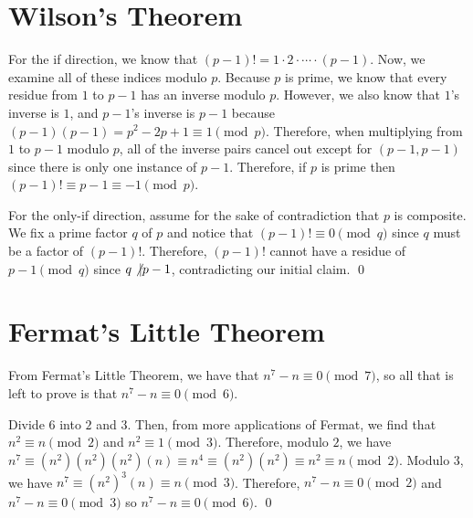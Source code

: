 \documentclass{article}
\begin{document}
	\newpage
	\section{Wilson's Theorem}
	For the if direction, we know that $(p-1)! = 1 \cdot 2 \cdot \cdots \cdot (p-1)$. Now, we examine all of these indices modulo $p$. Because 
	$p$ is prime, we know that every residue from $1$ to $p-1$ has an inverse modulo $p$. However, we also know that $1$'s 
	inverse is $1$, and $p-1$'s inverse is $p-1$ because $(p-1)(p-1) = p^2-2p+1 \equiv 1 \pmod p$. Therefore, when multiplying 
	from $1$ to $p-1$ modulo $p$, all of the inverse pairs cancel out except for $(p-1, p-1)$ since there is only one instance
	of $p-1$. Therefore, if $p$ is prime then $(p-1)! \equiv p-1 \equiv -1 \pmod p$.

	For the only-if direction, assume for the sake of contradiction that $p$ is composite. We fix a prime factor $q$ of $p$ and notice that
	 $(p-1)! \equiv 0 \pmod q$
	since $q$ must be a factor of $(p-1)!$. Therefore, $(p-1)!$ cannot have a residue of $p-1 \pmod q$ since $q \not\vert p-1$, contradicting
	our initial claim. \qed

	\newpage
	\section{Fermat's Little Theorem}
	From Fermat's Little Theorem, we have that $n^7-n \equiv 0 \pmod 7$, so all that is left to prove is that $n^7-n \equiv 0 \pmod 6$.
	
	Divide $6$ into $2$ and $3$. Then, from more applications of Fermat, we find that $n^2 \equiv n \pmod 2$ and $n^2 \equiv 1 \pmod 3$.
	Therefore, modulo $2$, we have $n^7 \equiv (n^2)(n^2)(n^2)(n) \equiv n^4 \equiv (n^2)(n^2) \equiv n^2 \equiv n \pmod 2$. Modulo $3$,
	we have $n^7 \equiv (n^2)^3(n) \equiv n \pmod 3$. Therefore, $n^7 - n \equiv 0 \pmod 2$ and $n^7 - n \equiv 0 \pmod 3$ so 
	$n^7 - n \equiv 0 \pmod 6$. \qed
	
	\newpage
\end{document}
